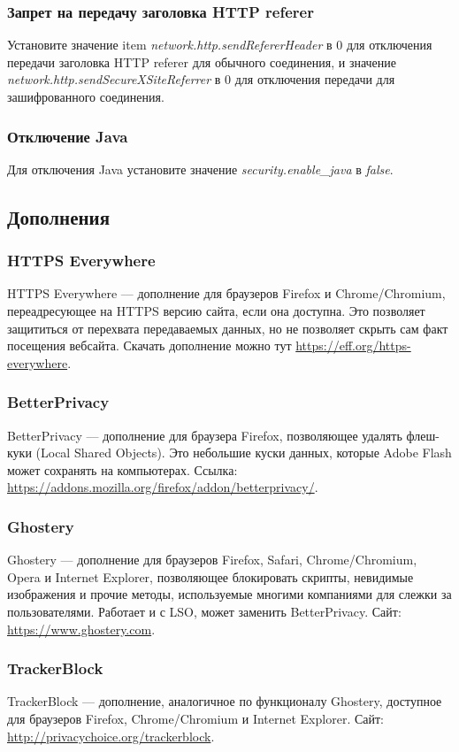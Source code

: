\subsubsection{Запрет на передачу заголовка HTTP referer}
Установите значение item \textit{network.http.sendRefererHeader} в  0 для отключения передачи заголовка HTTP referer для обычного соединения, и значение  \textit{network.http.sendSecureXSiteReferrer} в 0 для отключения передачи для зашифрованного соединения.
\subsubsection{Отключение Java}
Для отключения Java установите значение \textit{security.enable\_java} в \textit{false}.
\subsection{Дополнения}
\subsubsection{HTTPS Everywhere}
HTTPS Everywhere --- дополнение для браузеров Firefox и Chrome/Chromium, переадресующее на HTTPS версию сайта, если она доступна. Это позволяет защититься от перехвата передаваемых данных, но не позволяет скрыть сам факт посещения вебсайта. Скачать дополнение можно тут \url{https://eff.org/https-everywhere}.
\subsubsection{BetterPrivacy}
BetterPrivacy --- дополнение для браузера Firefox, позволяющее удалять флеш-куки (Local Shared Objects). Это небольшие куски данных, которые Adobe Flash может сохранять на компьютерах. Ссылка: \url{https://addons.mozilla.org/firefox/addon/betterprivacy/}.
\subsubsection{Ghostery}
Ghostery --- дополнение для браузеров Firefox, Safari, Chrome/Chromium, Opera и Internet Explorer, позволяющее блокировать скрипты, невидимые изображения и прочие методы, используемые многими компаниями для слежки за пользователями. Работает и с LSO, может заменить BetterPrivacy. Сайт: \url{https://www.ghostery.com}.
\subsubsection{TrackerBlock}
TrackerBlock --- дополнение, аналогичное по функционалу Ghostery, доступное для браузеров Firefox, Chrome/Chromium и Internet Explorer. Сайт: \url{http://privacychoice.org/trackerblock}.
